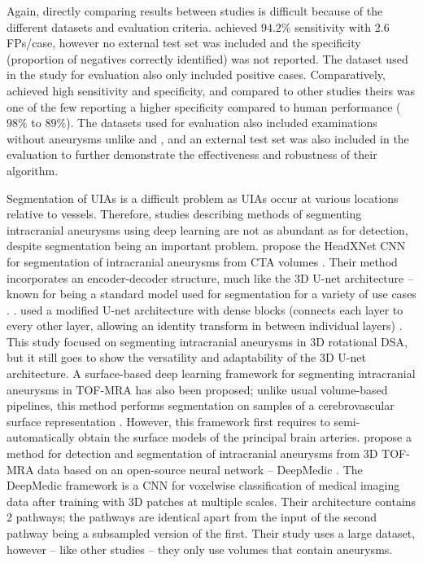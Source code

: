 Again, directly comparing results between studies is difficult because of the different datasets and evaluation criteria. \citeauthor{Nakao2018} achieved $94.2\%$ sensitivity with $2.6$ FPs/case, however no external test set was included and the specificity (proportion of negatives correctly identified) was not reported. The dataset used in the study for evaluation also only included positive cases. Comparatively, \citeauthor{Joo2020} achieved high sensitivity and specificity, and compared to other studies theirs was one of the few reporting a higher specificity compared to human performance ($98\%$ to $89\%$). The datasets used for evaluation also included examinations without aneurysms unlike \citeauthor{Ueda2019} and \citeauthor{Nakao2018}, and an external test set was also included in the evaluation to further demonstrate the effectiveness and robustness of their algorithm.

Segmentation of UIAs is a difficult problem as UIAs occur at various locations relative to vessels. Therefore, studies describing methods of segmenting intracranial aneurysms using deep learning are not as abundant as for detection, despite segmentation being an important problem. \citeauthor{Park2019} propose the HeadXNet CNN for segmentation of intracranial aneurysms from CTA volumes \cite{Park2019}. Their method incorporates an encoder-decoder structure, much like the 3D U-net architecture -- known for being a standard model used for segmentation for a variety of use cases \cite{3dunet}. . \citeauthor{Liu2021} used a modified U-net architecture with dense blocks (connects each layer to every other layer, allowing an identity transform in between individual layers) \cite{Liu2021}. This study focused on segmenting intracranial aneurysms in 3D rotational DSA, but it still goes to show the versatility and adaptability  of the 3D U-net architecture. A surface-based deep learning framework for segmenting intracranial aneurysms in TOF-MRA has also been proposed; unlike usual volume-based pipelines, this method performs segmentation on samples of a cerebrovascular surface representation \cite{Yang2020}. However, this framework first requires to semi-automatically obtain the surface models of the principal brain arteries. \citeauthor{Sichermann2019} propose a method for detection and segmentation of intracranial aneurysms from 3D TOF-MRA data based on an open-source neural network --  DeepMedic \cite{Sichermann2019}. The DeepMedic framework is a CNN for voxelwise classification of medical imaging data after training with 3D patches at multiple scales. Their architecture contains 2 pathways; the pathways are identical apart from the input of the second pathway being a subsampled version of the first. Their study uses a large dataset, however -- like other studies -- they only use volumes that contain aneurysms. 


